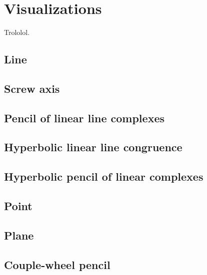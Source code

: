 \section{Visualizations}
\label{ch:visualization}

Trololol.

\subsection{Line}
\label{sec:visline}

\subsection{Screw axis}
\label{sec:visscrew}

\subsection{Pencil of linear line complexes}
\label{sec:vispen}

\subsection{Hyperbolic linear line congruence}
\label{sec:vishypercon}

\subsection{Hyperbolic pencil of linear complexes}
\label{sec:vishyperpen}

\subsection{Point}
\label{sec:visrpoint}

\subsection{Plane}
\label{sec:visplane}

\subsection{Couple-wheel pencil}
\label{sec:vispenpair}
